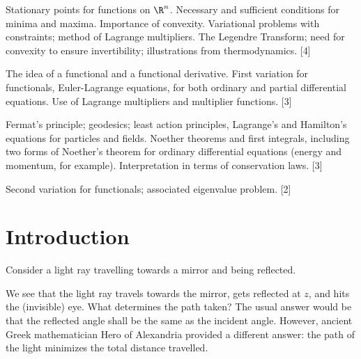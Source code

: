 \documentclass[a4paper]{article}
\begin{document}
\maketitle
{\small
\noindent Stationary points for functions on $\R^n$. Necessary and sufficient conditions for minima and maxima. Importance of convexity. Variational problems with constraints; method of Lagrange multipliers. The Legendre Transform; need for convexity to ensure invertibility; illustrations from thermodynamics.\hspace*{\fill} [4]

\vspace{5pt}
\noindent The idea of a functional and a functional derivative. First variation for functionals, Euler-Lagrange equations, for both ordinary and partial differential equations. Use of Lagrange multipliers and multiplier functions.\hspace*{\fill} [3]

\vspace{5pt}
\noindent Fermat's principle; geodesics; least action principles, Lagrange's and Hamilton's equations for particles and fields. Noether theorems and first integrals, including two forms of Noether's theorem for ordinary differential equations (energy and momentum, for example). Interpretation in terms of conservation laws.\hspace*{\fill} [3]

\vspace{5pt}
\noindent Second variation for functionals; associated eigenvalue problem.\hspace*{\fill} [2]}

\tableofcontents
\setcounter{section}{-1}
\section{Introduction}
Consider a light ray travelling towards a mirror and being reflected.
\begin{center}
\end{center}
We see that the light ray travels towards the mirror, gets reflected at $z$, and hits the (invisible) eye. What determines the path taken? The usual answer would be that the reflected angle shall be the same as the incident angle. However, ancient Greek mathematician Hero of Alexandria provided a different answer: the path of the light minimizes the total distance travelled.
\end{document}
